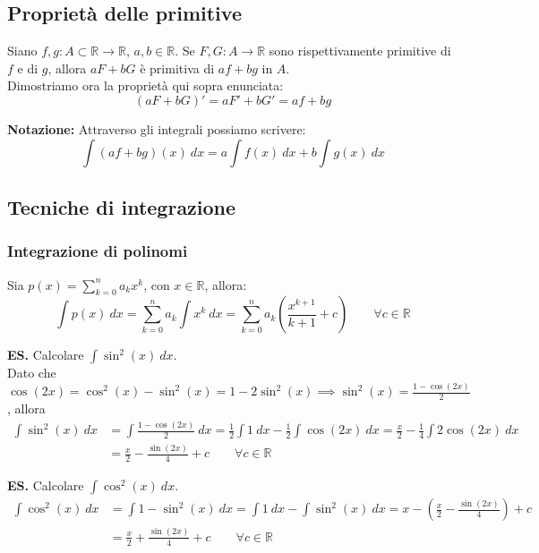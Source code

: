 \documentclass{article}
\begin{document}
\subsection{Proprietà delle primitive}
Siano $f, g: A \subset \mathbb{R} \xrightarrow{} \mathbb{R}$, $a, b \in \mathbb{R}$. Se $F, G: A \xrightarrow{} \mathbb{R}$ sono rispettivamente primitive di $f$ e di $g$, allora $aF + bG$ è primitiva di $af + bg$ in $A$.\\

\noindent Dimostriamo ora la proprietà qui sopra enunciata:
\begin{equation*}
    (aF + bG)' = aF' + bG' = af + bg
\end{equation*}

\noindent\textbf{Notazione:} Attraverso gli integrali possiamo scrivere:
\begin{equation*}
    \int (af + bg)(x) \ dx = a\int f(x) \ dx + b\int g(x) \ dx
\end{equation*}

\subsection{Tecniche di integrazione}
\subsubsection{Integrazione di polinomi}
Sia $p(x) = \sum_{k = 0}^{n} a_kx^k$, con $x \in \mathbb{R}$, allora:
\begin{equation*}
    \int p(x) \ dx = \sum_{k = 0}^n a_k \int x^k \ dx = \sum_{k = 0}^n a_k \left(\frac{x^{k + 1}}{k + 1} + c \right) \qquad \forall c \in \mathbb{R}
\end{equation*}

\noindent\textbf{ES.} Calcolare $\int \sin^2(x) \ dx$.\\
Dato che $\cos(2x) = \cos^2(x) - \sin^2(x) = 1 -2\sin^2(x) \implies \sin^2(x) = \frac{1 - \cos(2x)}{2}$, allora
\begin{align*}
    \int \sin^2(x) \ dx &= \int \frac{1 - \cos(2x)}{2} \ dx = \frac{1}{2}\int 1 \ dx - \frac{1}{2} \int \cos(2x) \ dx = \frac{x}{2} - \frac{1}{4} \int 2\cos(2x) \ dx \\
    &= \frac{x}{2} - \frac{\sin(2x)}{4} + c \qquad \forall c \in \mathbb{R}
\end{align*}

\noindent\textbf{ES.} Calcolare $\int \cos^2(x) \ dx$.\\
\begin{align*}
    \int \cos^2(x) \ dx &= \int 1 - \sin^2(x) \ dx = \int 1 \ dx - \int \sin^2(x) \ dx = x - \left(\frac{x}{2} - \frac{\sin(2x)}{4}\right) + c \\
    &= \frac{x}{2} + \frac{\sin(2x)}{4} + c \qquad \forall c \in \mathbb{R}
\end{align*}
\end{document}
